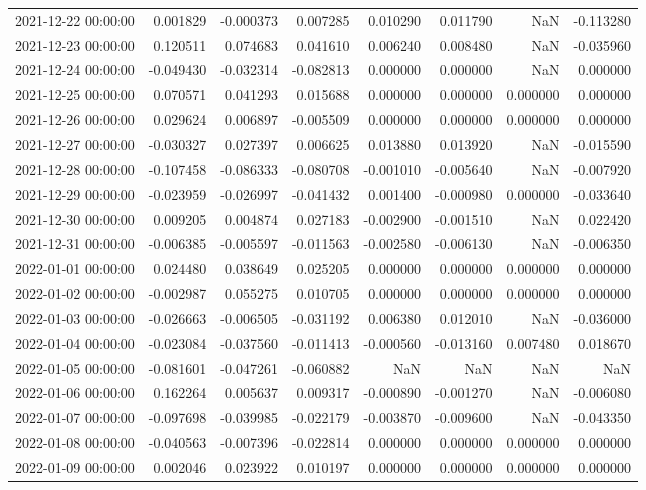 \begin{tabular}{lrrrrrrr}
2021-12-22 00:00:00 & 0.001829 & -0.000373 & 0.007285 & 0.010290 & 0.011790 & NaN & -0.113280 \\
2021-12-23 00:00:00 & 0.120511 & 0.074683 & 0.041610 & 0.006240 & 0.008480 & NaN & -0.035960 \\
2021-12-24 00:00:00 & -0.049430 & -0.032314 & -0.082813 & 0.000000 & 0.000000 & NaN & 0.000000 \\
2021-12-25 00:00:00 & 0.070571 & 0.041293 & 0.015688 & 0.000000 & 0.000000 & 0.000000 & 0.000000 \\
2021-12-26 00:00:00 & 0.029624 & 0.006897 & -0.005509 & 0.000000 & 0.000000 & 0.000000 & 0.000000 \\
2021-12-27 00:00:00 & -0.030327 & 0.027397 & 0.006625 & 0.013880 & 0.013920 & NaN & -0.015590 \\
2021-12-28 00:00:00 & -0.107458 & -0.086333 & -0.080708 & -0.001010 & -0.005640 & NaN & -0.007920 \\
2021-12-29 00:00:00 & -0.023959 & -0.026997 & -0.041432 & 0.001400 & -0.000980 & 0.000000 & -0.033640 \\
2021-12-30 00:00:00 & 0.009205 & 0.004874 & 0.027183 & -0.002900 & -0.001510 & NaN & 0.022420 \\
2021-12-31 00:00:00 & -0.006385 & -0.005597 & -0.011563 & -0.002580 & -0.006130 & NaN & -0.006350 \\
2022-01-01 00:00:00 & 0.024480 & 0.038649 & 0.025205 & 0.000000 & 0.000000 & 0.000000 & 0.000000 \\
2022-01-02 00:00:00 & -0.002987 & 0.055275 & 0.010705 & 0.000000 & 0.000000 & 0.000000 & 0.000000 \\
2022-01-03 00:00:00 & -0.026663 & -0.006505 & -0.031192 & 0.006380 & 0.012010 & NaN & -0.036000 \\
2022-01-04 00:00:00 & -0.023084 & -0.037560 & -0.011413 & -0.000560 & -0.013160 & 0.007480 & 0.018670 \\
2022-01-05 00:00:00 & -0.081601 & -0.047261 & -0.060882 & NaN & NaN & NaN & NaN \\
2022-01-06 00:00:00 & 0.162264 & 0.005637 & 0.009317 & -0.000890 & -0.001270 & NaN & -0.006080 \\
2022-01-07 00:00:00 & -0.097698 & -0.039985 & -0.022179 & -0.003870 & -0.009600 & NaN & -0.043350 \\
2022-01-08 00:00:00 & -0.040563 & -0.007396 & -0.022814 & 0.000000 & 0.000000 & 0.000000 & 0.000000 \\
2022-01-09 00:00:00 & 0.002046 & 0.023922 & 0.010197 & 0.000000 & 0.000000 & 0.000000 & 0.000000 \\

\end{tabular}
